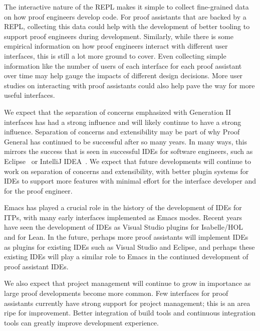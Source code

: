 The interactive nature of the REPL makes it simple to collect fine-grained data
on how proof engineers develop code. For proof assistants that are backed by a REPL,
collecting this data could help with the development of better tooling to support
proof engineers during development.
Similarly, while there is some empirical information on how proof engineers interact with different user interfaces,
this is still a lot more ground to cover. Even collecting simple information like the number of users of each interface for each proof assistant over time may 
help gauge the impacts of different design decisions.
More user studies on interacting with proof assistants could also help pave the way for more useful interfaces.

We expect that the separation of concerns emphasized with Generation II interfaces
has had a strong influence and will likely continue to have a strong influence. 
Separation of concerns and extensibility may be part of why
Proof General has continued to be successful after so many years.
In many ways, this mirrors the success
that is seen in successful IDEs for software engineers, such
as Eclipse~\citep{eclipse} or IntelliJ IDEA~\citep{intellij}. %
We expect
that future developments will continue to work on separation of concerns
and extensibility, with better plugin systems for IDEs to support more features
with minimal effort for the interface developer and for the proof engineer.

Emacs has played a crucial role in the history of the development of IDEs for ITPs,
with many early interfaces implemented as Emacs modes. Recent years have seen the development
of IDEs as Visual Studio plugins for Isabelle/HOL and for Lean.
In the future, perhaps more proof assistants will implement IDEs as plugins for existing IDEs such as
Visual Studio and Eclipse, and perhaps these existing IDEs will play 
a similar role to Emacs in the continued development of proof assistant IDEs.

We also expect that project management will continue to grow in importance
as large proof developments become more common. Few interfaces for proof assistants
currently have strong support for project management; this is an area ripe for
improvement. Better integration of build tools and continuous integration tools
can greatly improve development experience. %

